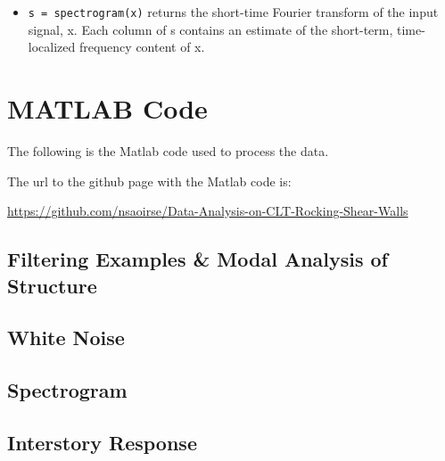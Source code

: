\documentclass{article}
\begin{document}
\begin{appendices}
\begin{itemize}
    \item \texttt{s = spectrogram(x)} returns the short-time Fourier transform of the input signal, x. Each column of s contains an estimate of the short-term, time-localized frequency content of x.
    
\end{itemize}

\section{MATLAB Code}
The following is the Matlab code used to process the data. 

\medskip
\noindent
The url to the github page with the Matlab code is:

\noindent
\url{https://github.com/nsaoirse/Data-Analysis-on-CLT-Rocking-Shear-Walls}

\subsection{Filtering Examples \& Modal Analysis of Structure}



\subsection{White Noise}



\subsection{Spectrogram}



\subsection{Interstory Response}

 
 
 
 
 
\end{appendices}
\end{document}
